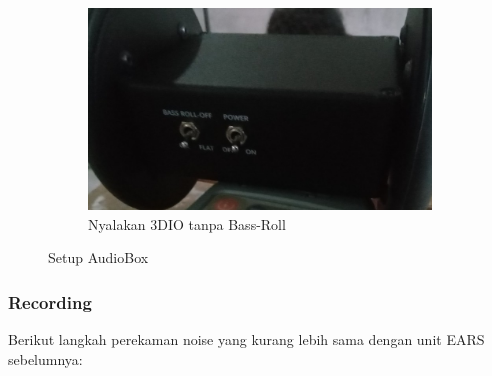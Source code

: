 \documentclass{article}
\begin{document}
\begin{figure}[H]
\begin{subfigure}[]{.4\textwidth}
			\includegraphics[width=\textwidth,angle=0]{images/3dio_unit_on}
			\caption{Nyalakan 3DIO tanpa Bass-Roll}
		\end{subfigure}
		\caption{Setup AudioBox}
	\end{figure}

	\subsubsection{Recording}

	Berikut langkah perekaman noise yang kurang lebih sama dengan unit EARS sebelumnya:
\end{document}
